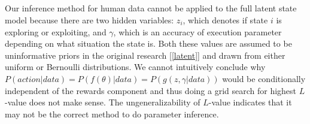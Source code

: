 \subsection{}
Our inference method for human data cannot be applied to the full latent state model because there are two hidden variables: $z_i$, which denotes if state $i$ is exploring or exploiting, and $\gamma$, which is an accuracy of execution parameter depending on what situation the state is. Both these values are assumed to be uninformative priors in the original research [\ref{latent}] and drawn from either uniform or Bernoulli distributions. We cannot intuitively conclude why $P(action|data) = P(f(\theta)|data) = P(g(z,\gamma|data))$ would be conditionally independent of the rewards component and thus doing a grid search for highest $L$-value does not make sense. The ungeneralizability of $L$-value indicates that it may not be the correct method to do parameter inference.
